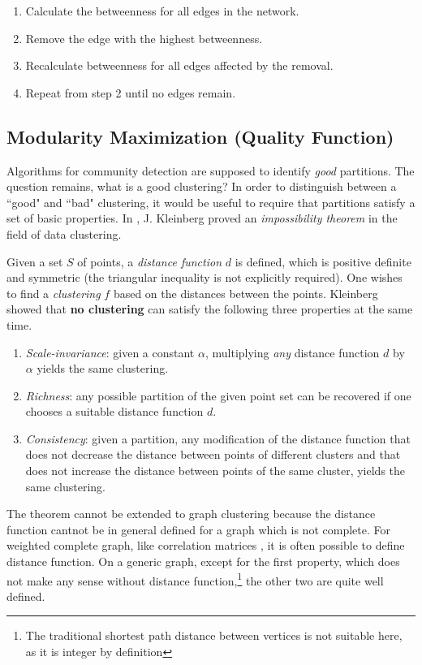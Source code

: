 {\begin{enumerate}
	\item Calculate the betweenness for all edges in the network.
	\item Remove the edge with the highest betweenness.
	\item Recalculate betweenness for all edges affected by the removal.
	\item Repeat from step 2 until no edges remain.
\end{enumerate}

\subsection{Modularity Maximization (Quality Function)}
Algorithms for community detection are supposed to identify \textit{good} partitions. The question remains, what is a good clustering? In order to distinguish between a ``good" and ``bad" clustering, it would be useful to require that partitions satisfy a set of basic properties. In \cite{ref-14}, J. Kleinberg proved an \textit{impossibility theorem} in the field of data clustering.

Given a set $S$ of points, a \textit{distance function} $d$ is defined, which is positive definite and symmetric (the triangular inequality is not explicitly required). One wishes to find a \textit{clustering} $f$ based on the distances between the points. Kleinberg showed that \textbf{no clustering} can satisfy the following three properties at the same time.

\begin{enumerate}
	\item \textit{Scale-invariance}: given a constant $\alpha$, multiplying \textit{any} distance function $d$ by $\alpha$ yields the same clustering.
	\item \textit{Richness}: any possible partition of the given point set can be recovered if one chooses a suitable distance function $d$.
	\item \textit{Consistency}: given a partition, any modification of the distance function that does not decrease the distance between points of different clusters and that does not increase the distance between points of the same cluster, yields the same clustering.
\end{enumerate}

The theorem cannot be extended to graph clustering because the distance function cantnot be in general defined for a graph which is not complete. For weighted complete graph, like  correlation matrices \cite{ref-15}, it is often possible to define distance function. On a generic graph, except for the first property, which does not make any sense without distance function,\footnote{The traditional shortest path distance between vertices is not suitable here, as it is integer by definition} the other two are quite well defined.

}
